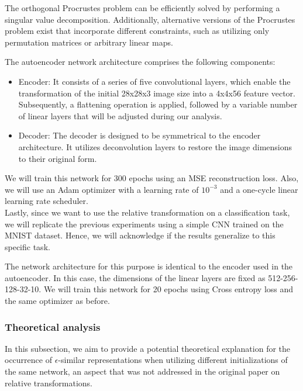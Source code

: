 \documentclass[../main.tex]{subfiles}
\begin{document}
\begin{remark}
The orthogonal Procrustes problem can be efficiently solved by performing a singular value decomposition. Additionally, alternative versions of the Procrustes problem exist that incorporate different constraints, such as utilizing only permutation matrices or arbitrary linear maps.
\end{remark}

The autoencoder network architecture comprises the following components:

\begin{itemize}
\item Encoder: It consists of a series of five convolutional layers, which enable the transformation of the initial 28x28x3 image size into a 4x4x56 feature vector. Subsequently, a flattening operation is applied, followed by a variable number of linear layers that will be adjusted during our analysis.
\item Decoder: The decoder is designed to be symmetrical to the encoder architecture. It utilizes deconvolution layers to restore the image dimensions to their original form.
\end{itemize}

We will train this network for 300 epochs using an MSE reconstruction loss. Also, we will use an Adam optimizer with a learning rate of $10^{-3}$ and a one-cycle linear learning rate scheduler.\\

Lastly, since we want to use the relative transformation on a classification task, we will replicate the previous experiments using a simple CNN trained on the MNIST dataset. Hence, we will acknowledge if the results generalize to this specific task. 

The network architecture for this purpose is identical to the encoder used in the autoencoder. In this case, the dimensions of the linear layers are fixed as 512-256-128-32-10. We will train this network for 20 epochs using Cross entropy loss and the same optimizer as before.\\

\subsubsection*{Theoretical analysis}
In this subsection, we aim to provide a potential theoretical explanation for the occurrence of $\epsilon$-similar representations when utilizing different initializations of the same network, an aspect that was not addressed in the original paper on relative transformations.\\
\end{document}
